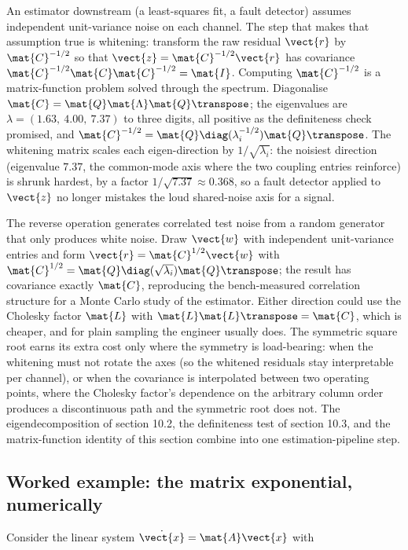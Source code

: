 An estimator downstream (a least-squares fit, a fault detector) assumes
independent unit-variance noise on each channel. The step that makes
that assumption true is whitening: transform the raw residual
$\vect{r}$ by $\mat{C}^{-1/2}$ so that $\vect{z} = \mat{C}^{-1/2}
\vect{r}$ has covariance $\mat{C}^{-1/2}\mat{C}\mat{C}^{-1/2} =
\mat{I}$. Computing $\mat{C}^{-1/2}$ is a matrix-function problem
solved through the spectrum. Diagonalise $\mat{C} = \mat{Q}\mat{\Lambda}
\mat{Q}\transpose$; the eigenvalues are $\lambda = (1.63,\ 4.00,\ 7.37)$
to three digits, all positive as the definiteness check promised, and
$\mat{C}^{-1/2} = \mat{Q}\diag(\lambda_i^{-1/2})\mat{Q}\transpose$. The
whitening matrix scales each eigen-direction by $1/\sqrt{\lambda_i}$:
the noisiest direction (eigenvalue $7.37$, the common-mode axis where
the two coupling entries reinforce) is shrunk hardest, by a factor
$1/\sqrt{7.37} \approx 0.368$, so a fault detector applied to $\vect{z}$
no longer mistakes the loud shared-noise axis for a signal.

The reverse operation generates correlated test noise from a random
generator that only produces white noise. Draw $\vect{w}$ with
independent unit-variance entries and form $\vect{r} = \mat{C}^{1/2}
\vect{w}$ with $\mat{C}^{1/2} = \mat{Q}\diag(\sqrt{\lambda_i})\mat{Q}
\transpose$; the result has covariance exactly $\mat{C}$, reproducing
the bench-measured correlation structure for a Monte Carlo study of the
estimator. Either direction could use the Cholesky factor $\mat{L}$
with $\mat{L}\mat{L}\transpose = \mat{C}$, which is cheaper, and for
plain sampling the engineer usually does. The symmetric square root
earns its extra cost only where the symmetry is load-bearing: when the
whitening must not rotate the axes (so the whitened residuals stay
interpretable per channel), or when the covariance is interpolated
between two operating points, where the Cholesky factor's dependence on
the arbitrary column order produces a discontinuous path and the
symmetric root does not. The eigendecomposition of section 10.2, the
definiteness test of section 10.3, and the matrix-function identity of
this section combine into one estimation-pipeline step.

\subsection{Worked example: the matrix exponential, numerically}

Consider the linear system $\dot{\vect{x}} = \mat{A}\vect{x}$ with

